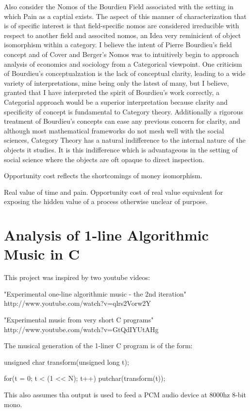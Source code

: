 \documentclass[11pt]{book}
\begin{document}
Also consider the Nomos of the Bourdieu Field associated with the setting in which Pain as a captial exists. The aspect of this manner of characterization that is of specific interest is that field-specific nomos are considered irreducible with respect to another field and associted nomos, an Idea very reminicient of object isomorphism within a category. I believe the intent of Pierre Bourdieu's field concept and of Cover and Berger's Nomos was to intuitively begin to approach analysis of economics and sociology from a Categorical viewpoint. One criticism of Bourdieu's conceptualzation is the lack of conceptual clarity, leading to a wide variety of interpretations, mine being only the latest of many, but I believe, granted that I have interpreted the spirit of Bourdieu's work correctly, a Categorial approach would be a superior interpretation because clarity and specificity of concept is fundamental to Category theory. Additionally a rigorous treatment of Bourdieu's concepts can ease any previous concern for clarity, and although most mathematical frameworks do not mesh well with the social sciences, Category Theory has a natural indifference to the internal nature of the objects it studies. It is this indifference which is advantageous in the setting of social science where the objects are oft opaque to direct inspection.

Opportunity cost reflects the shortcomings of money isomorphism.

Real value of time and pain. Opportunity cost of real value equivalent for exposing the hidden value of a process otherwise unclear of purpose.

\chapter{Analysis of 1-line Algorithmic Music in C}

This project was inspired by two youtube videos:

	"Experimental one-line algorithmic music - the 2nd iteration"
	http://www.youtube.com/watch?v=qlrs2Vorw2Y

	"Experimental music from very short C programs"
	http://www.youtube.com/watch?v=GtQdIYUtAHg

The musical generation of the 1-liner C program is of the form:

	unsigned char transform(unsigned long t);

	for(t = 0; t < (1 << N); t++) {
		putchar(transform(t));
	}

This also assumes tha output is used to feed a PCM audio device at 8000hz 8-bit mono.
\end{document}
